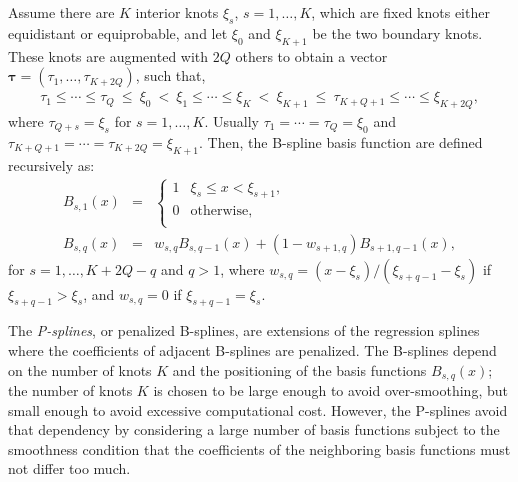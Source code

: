 \documentclass[11pt,letterpaper]{article}
\begin{document}
Assume there are $K$  interior knots $\xi_s$, $s=1,\ldots,K$, which are fixed knots either equidistant or equiprobable, and let $\xi_0$ and $\xi_{K+1}$ be the two boundary knots. 
These knots are augmented with $2Q$ others  to obtain a vector $\boldsymbol{\tau}=(\tau_1,\ldots,\tau_{K+2Q})$, such that,  
\begin{eqnarray*} 
\tau_1\leq\cdots\leq\tau_{Q} \ \leq \ \xi_{0} \ < \
 \xi_{1}\leq\cdots\leq\xi_{K}  
 \ < \ \xi_{K+1}\ \leq \ \tau_{K+Q+1}\leq\cdots\leq\xi_{K+2Q} , 
\end{eqnarray*} 
where $\tau_{Q+s}=\xi_s$ for $s=1,\ldots,K.$ Usually   $\tau_1=\cdots=\tau_Q=\xi_0$ and $\tau_{K+Q+1}=\cdots=\tau_{K+2Q}=\xi_{K+1}$.  
Then, the B-spline basis function are defined recursively as:
\begin{eqnarray*}
B_{s,1}(x) &=& \begin{cases}
1 & \xi_{s}\leq x<\xi_{s+1} , \\ 
0 & \text{otherwise}, \\
\end{cases}
\\
B_{s,q}(x) &=& w_{s,q}B_{s,q-1}(x) + (1-w_{s+1,q}) B_{s+1,q-1}(x) , 
\end{eqnarray*}
for $s=1,\ldots,K+2Q-q$ and $q>1$, 
where 
$w_{s,q} = 
({x-\xi_{s}})/({\xi_{s+q-1}-\xi_{s}})$  if $\xi_{s+q-1}>\xi_{s}$, and   
$w_{s,q}=0$ if $\xi_{s+q-1}=\xi_{s}$.  

 





The \textit{P-splines}, or penalized B-splines,   are extensions of the regression splines where the coefficients of adjacent B-splines are penalized. 
The  B-splines  depend on the number of knots $K$ and the positioning of the basis functions  $B_{s,q}(x)$; the number of knots $K$ is chosen to be large enough to avoid  over-smoothing, but small enough to avoid excessive computational cost.  However,  the P-splines avoid that dependency by considering a large number of basis functions subject to the smoothness condition that the coefficients of the neighboring basis functions must not differ too much.
\end{document}
